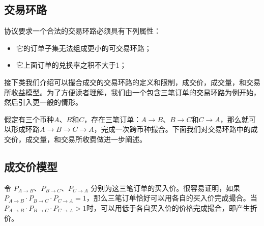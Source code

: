 \documentclass[UTF8,nofonts]{ctexart}
\begin{document}
\subsection{交易环路\label{sec:tradecircle}}

协议要求一个合法的交易环路必须具有下列属性：

\begin{itemize}
	\item 它的订单子集无法组成更小的可交易环路；
	\item 它上面订单的兑换率之积不大于1；
\end{itemize}



接下类我们介绍可以撮合成交的交易环路的定义和限制，成交价，成交量，和交易所收益模型。为了方便读者理解，我们由一个包含三笔订单的交易环路为例开始，然后引入更一般的情形。

假定有三个币种$A$、$B$和$C$，存在三笔订单：$A\rightarrow B$、$B \rightarrow C$和$C \rightarrow A$，那么就可以形成环路$A\rightarrow B \rightarrow C \rightarrow A$，完成一次跨币种撮合。下面我们对交易环路中的成交价，成交量，和交易所收费做进一步阐述。

\subsection{成交价模型\label{sec:pricemodel}}

令 $P_{A \rightarrow B}$、$P_{B \rightarrow C}$、$P_{C \rightarrow A}$ 分别为这三笔订单的买入价。很容易证明，如果$P_{A \rightarrow B}\cdot P_{B \rightarrow C}\cdot P_{C \rightarrow A}=1$，那么三笔订单恰好可以用各自的买入价完成撮合。当$P_{A \rightarrow B}\cdot P_{B \rightarrow C}\cdot P_{C \rightarrow A}>1$时，可以用低于各自买入价的价格完成撮合，即产生折价。





\end{document}
